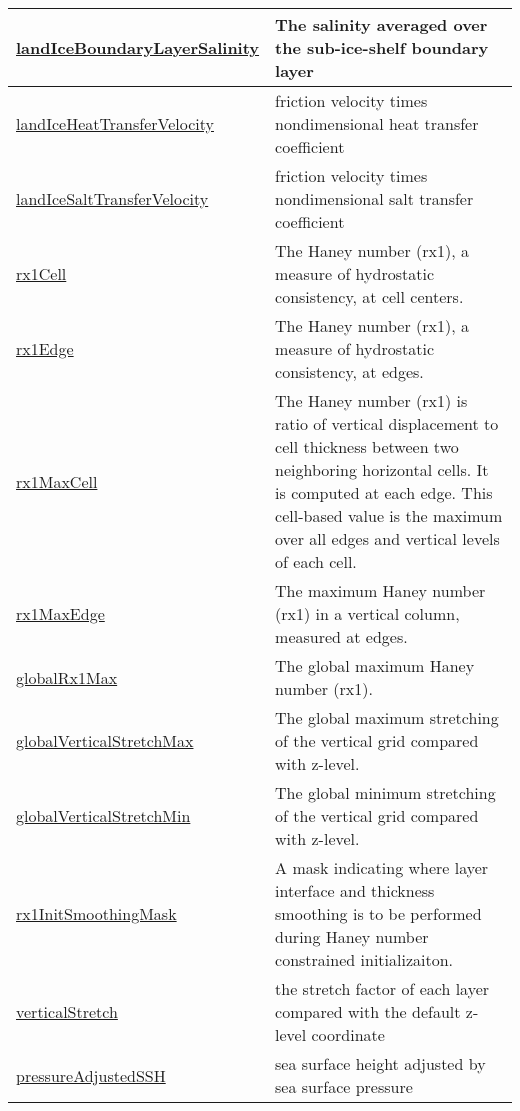 {\begin{center}
\begin{longtable}{| p{2.0in} | p{4.0in} |}
    \hline
    \hyperref[subsec:var_sec_diagnostics_landIceBoundaryLayerSalinity]{landIceBoundaryLayerSalinity} & The salinity averaged over the sub-ice-shelf boundary layer \\
    \hline
    \hyperref[subsec:var_sec_diagnostics_landIceHeatTransferVelocity]{landIceHeatTransferVelocity} & friction velocity times nondimensional heat transfer coefficient \\
    \hline
    \hyperref[subsec:var_sec_diagnostics_landIceSaltTransferVelocity]{landIceSaltTransferVelocity} & friction velocity times nondimensional salt transfer coefficient \\
    \hline
    \hyperref[subsec:var_sec_diagnostics_rx1Cell]{rx1Cell} & The Haney number (rx1), a measure of hydrostatic consistency, at cell centers. \\
    \hline
    \hyperref[subsec:var_sec_diagnostics_rx1Edge]{rx1Edge} & The Haney number (rx1), a measure of hydrostatic consistency, at edges. \\
    \hline
    \hyperref[subsec:var_sec_diagnostics_rx1MaxCell]{rx1MaxCell} & The Haney number (rx1) is ratio of vertical displacement to cell thickness between two neighboring horizontal cells.  It is computed at each edge.  This cell-based value is the maximum over all edges and vertical levels of each cell. \\
    \hline
    \hyperref[subsec:var_sec_diagnostics_rx1MaxEdge]{rx1MaxEdge} & The maximum Haney number (rx1) in a vertical column, measured at edges. \\
    \hline
    \hyperref[subsec:var_sec_diagnostics_globalRx1Max]{globalRx1Max} & The global maximum Haney number (rx1). \\
    \hline
    \hyperref[subsec:var_sec_diagnostics_globalVerticalStretchMax]{globalVerticalStretchMax} & The global maximum stretching of the vertical grid compared with z-level. \\
    \hline
    \hyperref[subsec:var_sec_diagnostics_globalVerticalStretchMin]{globalVerticalStretchMin} & The global minimum stretching of the vertical grid compared with z-level. \\
    \hline
    \hyperref[subsec:var_sec_diagnostics_rx1InitSmoothingMask]{rx1InitSmoothingMask} & A mask indicating where layer interface and thickness smoothing is to be performed during Haney number constrained initializaiton. \\
    \hline
    \hyperref[subsec:var_sec_diagnostics_verticalStretch]{verticalStretch} & the stretch factor of each layer compared with the default z-level coordinate \\
    \hline
    \hyperref[subsec:var_sec_diagnostics_pressureAdjustedSSH]{pressureAdjustedSSH} & sea surface height adjusted by sea surface pressure \\
    \hline
\end{longtable}
\end{center}
}
